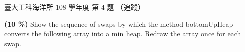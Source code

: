 \begin{pastexam}[label={px:ntu-108-esoe-ds-04}]{臺大工科海洋所 108 學年度 第 4 題}
（追蹤）

\textbf{(10 \%)} Show the sequence of swaps by which the method \textsf{bottomUpHeap} converts the
following array into a min heap. Redraw the array once for each swap.

\begin{center}
\end{center}
\end{pastexam}

